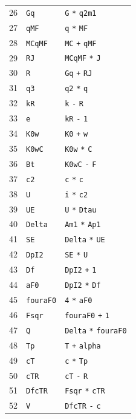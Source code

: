 \begin{longtable}{@{}rll@{}}
26 & \texttt{Gq} & \texttt{G} \texttt{*} \texttt{q2m1}\\
27 & \texttt{qMF} & \texttt{q} \texttt{*} \texttt{MF}\\
28 & \texttt{MCqMF} & \texttt{MC} \texttt{+} \texttt{qMF}\\
29 & \texttt{RJ} & \texttt{MCqMF} \texttt{*} \texttt{J}\\
30 & \texttt{R} & \texttt{Gq} \texttt{+} \texttt{RJ}\\
31 & \texttt{q3} & \texttt{q2} \texttt{*} \texttt{q}\\
32 & \texttt{kR} & \texttt{k} \texttt{-} \texttt{R}\\
33 & \texttt{e} & \texttt{kR} \texttt{-} \texttt{1}\\
34 & \texttt{K0w} & \texttt{K0} \texttt{+} \texttt{w}\\
35 & \texttt{K0wC} & \texttt{K0w} \texttt{*} \texttt{C}\\
36 & \texttt{Bt} & \texttt{K0wC} \texttt{-} \texttt{F}\\
37 & \texttt{c2} & \texttt{c} \texttt{*} \texttt{c}\\
38 & \texttt{U} & \texttt{i} \texttt{*} \texttt{c2}\\
39 & \texttt{UE} & \texttt{U} \texttt{*} \texttt{Dtau}\\
40 & \texttt{Delta} & \texttt{Am1} \texttt{*} \texttt{Ap1}\\
41 & \texttt{SE} & \texttt{Delta} \texttt{*} \texttt{UE}\\
42 & \texttt{DpI2} & \texttt{SE} \texttt{*} \texttt{U}\\
43 & \texttt{Df} & \texttt{DpI2} \texttt{+} \texttt{1}\\
44 & \texttt{aF0} & \texttt{DpI2} \texttt{*} \texttt{Df}\\
45 & \texttt{fouraF0} & \texttt{4} \texttt{*} \texttt{aF0}\\
46 & \texttt{Fsqr} & \texttt{fouraF0} \texttt{+} \texttt{1}\\
47 & \texttt{Q} & \texttt{Delta} \texttt{*} \texttt{fouraF0}\\
48 & \texttt{Tp} & \texttt{T} \texttt{+} \texttt{alpha}\\
49 & \texttt{cT} & \texttt{c} \texttt{*} \texttt{Tp}\\
50 & \texttt{cTR} & \texttt{cT} \texttt{-} \texttt{R}\\
51 & \texttt{DfcTR} & \texttt{Fsqr} \texttt{*} \texttt{cTR}\\
52 & \texttt{V} & \texttt{DfcTR} \texttt{-} \texttt{c}\\

\end{longtable}
